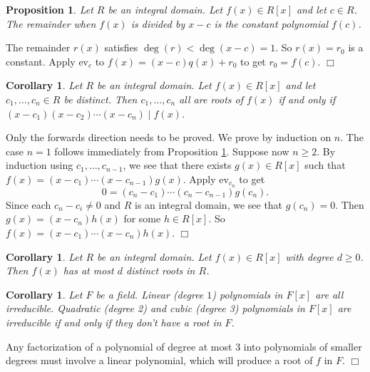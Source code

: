 \documentclass{article}
\newtheorem{cor}[subsection]{Corollary}
\newtheorem{proposition}[subsection]{Proposition}
\newenvironment{proof}{\noindent {\bf Proof:}}{$\Box$ \vspace{2 ex}}
\begin{document}
\begin{proposition}\label{prop:rem}
    Let $R$ be an integral domain. Let $f(x)\in R[x]$ and let $c\in R$. The remainder when $f(x)$ is divided by $x - c$ is the constant polynomial $f(c)$.
\end{proposition}

\begin{proof}
    The remainder $r(x)$ satisfies $\deg(r) < \deg(x - c) = 1$. So $r(x) = r_0$ is a constant. Apply $\text{ev}_c$ to $f(x) = (x - c)q(x) + r_0$ to get $r_0 = f(c)$.
\end{proof}

\begin{cor}
    Let $R$ be an integral domain. Let $f(x)\in R[x]$ and let $c_1,\ldots,c_n\in R$ be distinct. Then $c_1,\ldots,c_n$ all are roots of $f(x)$ if and only if $(x - c_1)(x - c_2)\cdots(x - c_n) \mid f(x)$.
\end{cor}

\begin{proof}
    Only the forwards direction needs to be proved. We prove by induction on $n$. The case $n = 1$ follows immediately from Proposition \ref{prop:rem}. Suppose now $n\geq 2$. By induction using $c_1,\ldots,c_{n-1}$, we see that there exists $g(x)\in R[x]$ such that $f(x) = (x - c_1)\cdots(x - c_{n-1})g(x)$. Apply $\text{ev}_{c_n}$ to get $$0 = (c_n-c_1)\cdots(c_n-c_{n-1})g(c_n).$$
    Since each $c_n - c_i\neq 0$ and $R$ is an integral domain, we see that $g(c_n) = 0$. Then $g(x) = (x - c_n)h(x)$ for some $h\in R[x]$. So $f(x) = (x - c_1)\cdots(x - c_n)h(x)$.
\end{proof}

\begin{cor}
    Let $R$ be an integral domain. Let $f(x)\in R[x]$ with degree $d\geq0$. Then $f(x)$ has at most $d$ distinct roots in $R$.
\end{cor}

\begin{cor}
    Let $F$ be a field. Linear (degree $1$) polynomials in $F[x]$ are all irreducible. Quadratic (degree 2) and cubic (degree 3) polynomials in $F[x]$ are irreducible if and only if they don't have a root in $F$.
\end{cor}

\begin{proof}
    Any factorization of a polynomial of degree at most $3$ into polynomials of smaller degrees must involve a linear polynomial, which will produce a root of $f$ in $F$.
\end{proof}
\end{document}

